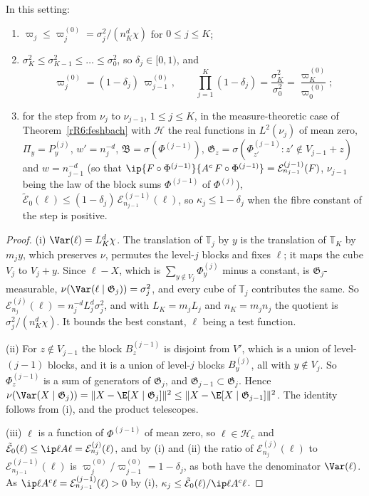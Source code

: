\begin{proposition}\label{rR6:zeromode}
In this setting:
\begin{enumerate}[label=\textup{(\roman*)},leftmargin=*]
\item $\varpi_j\le\varpi^{(0)}_j=\sigma_j^2/(n_K^d\chi)$ for $0\le j\le K$;
\item $\sigma_K^2\le\sigma_{K-1}^2\le\dots\le\sigma_0^2$, so $\delta_j\in
[0,1)$, and
\[
\varpi^{(0)}_j=(1-\delta_j)\,\varpi^{(0)}_{j-1},\qquad\prod_{j=1}^K(1-
\delta_j)=\frac{\sigma_K^2}{\sigma_0^2}=\frac{\varpi^{(0)}_K}{\varpi^{(0)}_0};
\]
\item for the step from $\nu_j$ to $\nu_{j-1}$, $1\le j\le K$, in the
measure-theoretic case of Theorem~\textup{\ref{rR6:feshbach}} with
$\mathcal H$ the real functions in $L^2(\nu_j)$ of mean zero, $\Pi_y=
P^{(j)}_y$, $w'=n_j^{-d}$, $\mathfrak B=\sigma(\Phi^{(j-1)})$, $\mathfrak
G_z=\sigma(\Phi^{(j-1)}_{z'}:z'\notin V_{j-1}+z)$ and $w=n_{j-1}^{-d}$
(so that $\ip{F\circ\Phi^{(j-1)}}{A^c\,F\circ\Phi^{(j-1)}}=\mathcal
E^{(j-1)}_{n_{j-1}}(F)$, $\nu_{j-1}$ being the law of the block sums
$\Phi^{(j-1)}$ of $\Phi^{(j)}$), $\tilde{\mathcal E}_0(\ell)\le(1-\delta_j)\,
\mathcal E^{(j-1)}_{n_{j-1}}(\ell)$, so $\kappa_j\le1-\delta_j$ when the
fibre constant of the step is positive.
\end{enumerate}
\end{proposition}

\begin{proof}
(i) $\Var(\ell)=L_K^d\chi$. The translation of $\mathbb T_j$ by $y$ is the
translation of $\mathbb T_K$ by $m_jy$, which preserves $\nu$, permutes the
level-$j$ blocks and fixes $\ell$; it maps the cube $V_j$ to $V_j+y$. Since
$\ell-X$, which is $\sum_{y\notin V_j}\Phi^{(j)}_y$ minus a constant, is
$\mathfrak G_j$-measurable, $\nu(
\Var(\ell\mid\mathfrak G_j))=\sigma_j^2$, and every cube of $\mathbb T_j$
contributes the same. So $\mathcal E^{(j)}_{n_j}(\ell)=n_j^{-d}L_j^d\sigma
_j^2$, and with $L_K=m_jL_j$ and $n_K=m_jn_j$ the quotient is $\sigma_j^2/
(n_K^d\chi)$. It bounds the best constant, $\ell$ being a test function.

(ii) For $z\notin V_{j-1}$ the block $B^{(j-1)}_z$ is disjoint from $V'$,
which is a union of level-$(j-1)$ blocks, and it is a union of level-$j$
blocks $B^{(j)}_y$, all with $y\notin V_j$. So $\Phi^{(j-1)}_z$ is a sum of
generators of $\mathfrak G_j$, and $\mathfrak G_{j-1}\subset\mathfrak G_j$.
Hence $\nu(\Var(X\mid\mathfrak G_j))=\lVert X-\E[X\mid\mathfrak G_j]
\rVert^2\le\lVert X-\E[X\mid\mathfrak G_{j-1}]\rVert^2$. The identity
follows from (i), and the product telescopes.

(iii) $\ell$ is a function of $\Phi^{(j-1)}$ of mean zero, so $\ell\in
\mathcal H_c$ and $\tilde{\mathcal E}_0(\ell)\le\ip\ell{A\ell}=\mathcal
E^{(j)}_{n_j}(\ell)$, and by (i) and (ii) the ratio of $\mathcal E^{(j)}_{n_j}(\ell)$ to
$\mathcal E^{(j-1)}_{n_{j-1}}(\ell)$ is $\varpi^{(0)}_j/\varpi^{(0)}_{j-1}=
1-\delta_j$, as both have the denominator $\Var(\ell)$. As $\ip\ell
{A^c\ell}=\mathcal E^{(j-1)}_{n_{j-1}}(\ell)>0$ by (i), $\kappa_j\le
\tilde{\mathcal E}_0(\ell)/\ip\ell{A^c\ell}$.
\end{proof}

